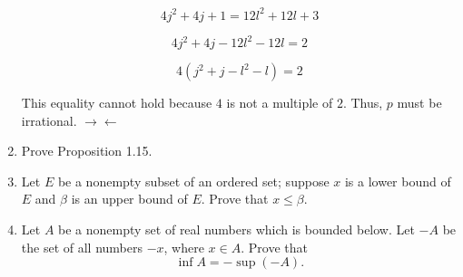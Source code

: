 \documentclass[12pt]{article}
\begin{document}
\begin{enumerate}
    \[4j^2 + 4j + 1 = 12l^2 + 12l + 3\]

    \[4j^2 + 4j -  12l^2 - 12l = 2\]

    \[4\left(j^2 + j - l^2 - l\right) = 2\]

    This equality cannot hold because $4$ is not a multiple of $2$. Thus, $p$ must be irrational. $\rightarrow \leftarrow$

    
    
    \item Prove Proposition 1.15.
    
    \item Let $E$ be a nonempty subset of an ordered set; suppose $x$ is a lower bound of $E$ and $\beta$ is an upper bound of $E$. Prove that $x \leq \beta$.
    
    \item Let $A$ be a nonempty set of real numbers which is bounded below. Let $-A$ be the set of all numbers $-x$, where $x \in A$. Prove that
    \[
    \inf A = -\sup(-A).
    \]
\end{enumerate}
\end{document}
